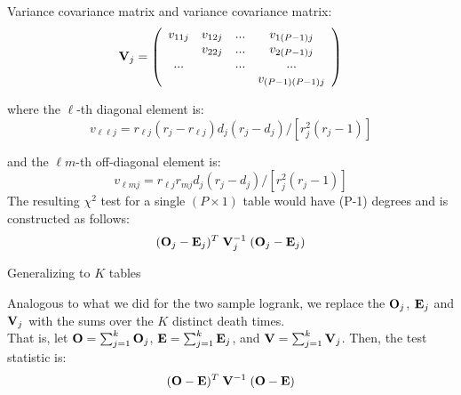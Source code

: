 \documentclass[envcountsect, 10pt, portrait, palatino]{beamer}
\begin{document}
\begin{frame}{Variance covariance matrix}
and variance covariance matrix:
  \[   {\bf V}_j = \left( \begin{array}{cccc}
                          v_{11j} & v_{12j} & ... & v_{1(P-1)j} \\
                                  & v_{22j} & ... & v_{2(P-1)j} \\
                              ... &         & ... & ... \\
                                  &         &     & v_{(P-1)(P-1)j} \\
                    \end{array} \right)  \]

where the $\ell$-th diagonal element is:
\[     v_{\ell\ell j} = r_{\ell j}(r_j-r_{\ell j})
d_j(r_j-d_j)/[r_j^2(r_j-1)]  \]

and the $\ell m$-th off-diagonal element is:
\[     v_{\ell m j} = r_{\ell j}r_{mj}d_j(r_j-d_j)/[r_j^2(r_j-1)]  \]
The resulting $\chi^2$ test for a single $(P \times 1)$ table would
have (P-1) degrees and is constructed as follows:
\[   ( {\bf O}_j - {\bf E}_j)^T \; {\bf V}^{-1}_j \; ( {\bf O}_j - {\bf E}_j)
\]

\end{frame}

\begin{frame}{Generalizing to $K$ tables}

Analogous to what we did for the two sample logrank, we replace the
$ {\bf O}_j$, ${\bf E}_j$ and ${\bf V}_j$ with the sums over the
$K$ distinct death times. \\[2ex]
That is, let
 $ {\bf O} = \sum_{j=1}^{k}  {\bf O}_j$,
 $ {\bf E} = \sum_{j=1}^{k}  {\bf E}_j$, and
 $ {\bf V} = \sum_{j=1}^{k}  {\bf V}_j$.  Then, the test
statistic is:
 \[
 ( {\bf O} - {\bf E})^T \; {\bf V}^{-1} \; ( {\bf O} - {\bf E})
\]
\end{frame}
\end{document}
